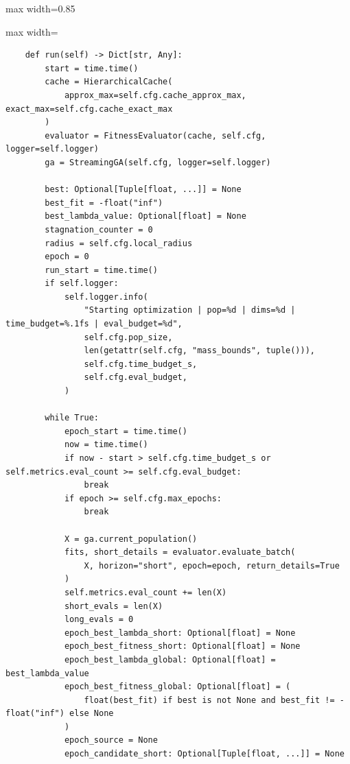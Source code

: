 \begin{listing}[H]
\caption{Fragmento principal de \texttt{ContinuousOptimizationController.run}}
\begin{adjustbox}{max width=0.85\textwidth}
\begin{minipage}{\linewidth}
{
\begin{adjustbox}{max width=\textwidth}
\begin{minipage}{\textwidth}
\begin{verbatim}
    def run(self) -> Dict[str, Any]:
        start = time.time()
        cache = HierarchicalCache(
            approx_max=self.cfg.cache_approx_max, exact_max=self.cfg.cache_exact_max
        )
        evaluator = FitnessEvaluator(cache, self.cfg, logger=self.logger)
        ga = StreamingGA(self.cfg, logger=self.logger)

        best: Optional[Tuple[float, ...]] = None
        best_fit = -float("inf")
        best_lambda_value: Optional[float] = None
        stagnation_counter = 0
        radius = self.cfg.local_radius
        epoch = 0
        run_start = time.time()
        if self.logger:
            self.logger.info(
                "Starting optimization | pop=%d | dims=%d | time_budget=%.1fs | eval_budget=%d",
                self.cfg.pop_size,
                len(getattr(self.cfg, "mass_bounds", tuple())),
                self.cfg.time_budget_s,
                self.cfg.eval_budget,
            )

        while True:
            epoch_start = time.time()
            now = time.time()
            if now - start > self.cfg.time_budget_s or self.metrics.eval_count >= self.cfg.eval_budget:
                break
            if epoch >= self.cfg.max_epochs:
                break

            X = ga.current_population()
            fits, short_details = evaluator.evaluate_batch(
                X, horizon="short", epoch=epoch, return_details=True
            )
            self.metrics.eval_count += len(X)
            short_evals = len(X)
            long_evals = 0
            epoch_best_lambda_short: Optional[float] = None
            epoch_best_fitness_short: Optional[float] = None
            epoch_best_lambda_global: Optional[float] = best_lambda_value
            epoch_best_fitness_global: Optional[float] = (
                float(best_fit) if best is not None and best_fit != -float("inf") else None
            )
            epoch_source = None
            epoch_candidate_short: Optional[Tuple[float, ...]] = None


\end{verbatim}
\end{minipage}
\end{adjustbox}}
\end{minipage}
\end{adjustbox}
\end{listing}
